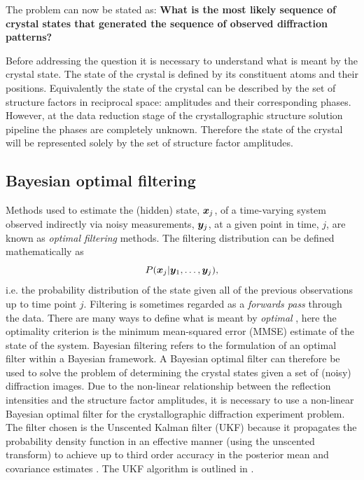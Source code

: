 The problem can now be stated as:
\textbf{What is the most likely sequence of crystal states that generated the sequence of observed diffraction patterns?}

Before addressing the question it is necessary to understand what is meant by the crystal state.
The state of the crystal is defined by its constituent atoms and their positions.
Equivalently the state of the crystal can be described by the set of structure factors in reciprocal space: amplitudes and their corresponding phases.
However, at the data reduction stage of the crystallographic structure solution pipeline the phases are completely unknown.
Therefore the state of the crystal will be represented solely by the set of structure factor amplitudes.

\subsection{Bayesian optimal filtering}
\label{sub:Bayesian optimal filtering}
Methods used to estimate the (hidden) state, $\boldsymbol{x}_j$, of a time-varying system observed indirectly via noisy measurements, $\boldsymbol{y}_j$, at a given point in time, $j$,  are known as \textit{optimal filtering} methods.
The filtering distribution can be defined mathematically as
\begin{equation}
    P(\boldsymbol{x}_j | \boldsymbol{y}_1, \ldots, \boldsymbol{y}_j),
    \label{eq:Filtering Distribution}
\end{equation}
i.e. the probability distribution of the state given all of the previous observations up to time point $j$.
Filtering is sometimes regarded as a \textit{forwards pass} through the data.
There are many ways to define what is meant by \textit{optimal} \cite{chen2003bayesian}, here the optimality criterion is the minimum mean-squared error (MMSE) estimate of the state of the system.
Bayesian filtering refers to the formulation of an optimal filter within a Bayesian framework.
A Bayesian optimal filter can therefore be used to solve the problem of determining the crystal states given a set of (noisy) diffraction images.
Due to the non-linear relationship between the reflection intensities and the structure factor amplitudes, it is necessary to use a non-linear Bayesian optimal filter for the crystallographic diffraction experiment problem.
The filter chosen is the Unscented Kalman filter (UKF) because it propagates the probability density function in an effective manner (using the unscented transform) to achieve up to third order accuracy in the posterior mean and covariance estimates \cite{wan2000unscented}.
The UKF algorithm is outlined in \cite{wan2002Unscented}.

